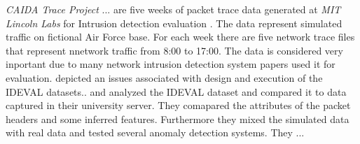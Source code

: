\emph{CAIDA Trace Project} \cite{caidaoc48trace,caida2010trace,caida2011trace}...
 are five weeks of packet trace data generated at \emph{MIT Lincoln Labs} for
Intrusion detection evaluation \cite{darpa1999ids}.  The data represent simulated traffic on fictional Air Force base.
For each week there are five network trace files that represent nnetwork traffic from 8:00 to 17:00. The data is considered
very inportant due to many network intrusion detection system papers used it for evaluation.
%
 \cite{mchugh2000testing} depicted an issues associated with design and execution of the IDEVAL datasets..
%
 and  \cite{mahoney2003analysis}
analyzed the IDEVAL dataset and compared it to data captured in their university server.
They comapared the attributes of the packet headers and some inferred features. Furthermore they mixed the simulated data with real data
and tested several anomaly detection systems. They ... %
%
